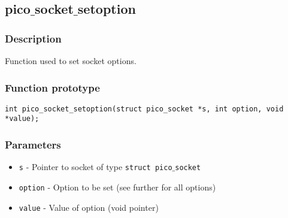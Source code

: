 \subsection{pico$\_$socket$\_$setoption}
\label{socket:setoption}
\subsubsection*{Description}
Function used to set socket options.

\subsubsection*{Function prototype}
\begin{verbatim}
int pico_socket_setoption(struct pico_socket *s, int option, void *value);
\end{verbatim}

\subsubsection*{Parameters}
\begin{itemize}[noitemsep]
\item \texttt{s} - Pointer to socket of type \texttt{struct pico$\_$socket}
\item \texttt{option} - Option to be set (see further for all options)
\item \texttt{value} - Value of option (void pointer)
\end{itemize}

